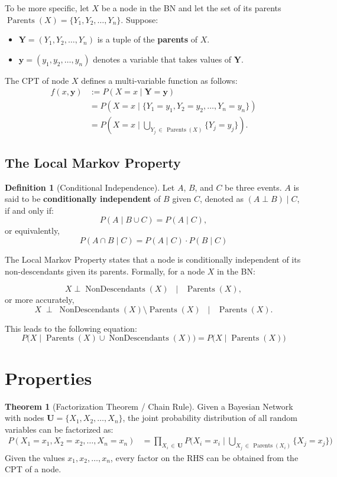 \documentclass[10pt,UTF8]{article}
\newenvironment{definitionBox}
{
  \begin{tcolorbox}[colback=blue!5!white,colframe=blue!75!black,parbox=false,before
  upper=\par,before lower=\par]}
  {
\end{tcolorbox}}
\newenvironment{theoremBox}
{
  \begin{tcolorbox}[colback=yellow!5!white,colframe=yellow!75!black,parbox=false,before
  upper=\par,before lower=\par]}
  {
\end{tcolorbox}}
\theoremstyle{definition}
\newtheorem{definition inner}{Definition}[section]
\newenvironment{definition}[1][]
{
  \begin{definitionBox}
  \begin{definition inner}[#1]\hfill\par}
    {
    \end{definition inner}
\end{definitionBox}}
\theoremstyle{definition}
\newtheorem{theorem inner}{Theorem}[section]
\newenvironment{theorem}[1][]
{
  \begin{theoremBox}
  \begin{theorem inner}[#1]\hfill\par}
    {
    \end{theorem inner}
\end{theoremBox}}
\theoremstyle{definition}
\newtheorem*{proof inner}{\textit{Proof}}
\theoremstyle{plain}
\newtheorem{tip inner}{Tip}[section]
\theoremstyle{remark}
\DeclareMathOperator{\Pa}{Parents} %
\DeclareMathOperator{\Nd}{NonDescendants} %
\begin{document}
To be more specific,
let \(X\) be a node in the BN and
let the set of its parents \(\Pa(X) = \{ Y_1, Y_2, \ldots, Y_n \} \). Suppose:
\begin{itemize}
  \item \(\bm{Y} = (Y_1, Y_2, \ldots, Y_n)\) is a tuple of the
    \textbf{parents} of \(X\).
  \item \(\bm{y} = (y_1, y_2, \ldots, y_n)\) denotes a variable that
    takes values of \(\bm{Y}\).
\end{itemize}
The CPT of node \(X\) defines a multi-variable function as follows:
\begin{align*}
  f(x, \bm{y}) & := P(X = x \mid \bm{Y} = \bm{y})
  \\
  & = P(X = x \mid  \big \{ Y_1 = y_1, Y_2 = y_2, \ldots, Y_n = y_n \big \} ) \\
  & = P(X = x \mid \! \! \! \!
    \bigcup_{Y_j \, \in \, \Pa(X)} \! \! \! \! \! \!
  \big \{ Y_j = y_j \big \} ).
\end{align*}

\subsection{The Local Markov Property}

\begin{definition}[Conditional Independence]
  Let \(A\), \(B\), and \(C\) be three events.
  \(A\) is said to be \textbf{conditionally independent} of \(B\) given \(C\),
  denoted as \((A \perp B )\mid C\),
  if and only if:
  \[
    P(A \mid B \cup C) = P(A \mid C),
  \]
  or equivalently,
  \[
    P(A \cap B \mid C) = P(A \mid C) \cdot
    P(B \mid C)
  \]
\end{definition}

The Local Markov Property states that a node is conditionally
independent of its non-descendants given its parents.
Formally, for a node \(X\) in the BN\@:

\[
  X \perp \Nd(X) \; \; \mid \; \; \Pa(X),
\]
or more accurately,
\[
  X \; \perp \; \Nd(X) \setminus \Pa(X)
  \; \; \mid \; \; \Pa(X).
\]

This leads to the following equation:
\[
  P\big(X \mid \Pa(X) \cup \Nd(X)\big) =
  P\big(X \mid \Pa(X)\big)
\]

\section{Properties}

\begin{theorem}[Factorization Theorem / Chain Rule]
  Given a Bayesian Network with nodes
  \(\bm{U} = \{ X_1, X_2, \ldots, X_n \} \),
  the joint probability distribution of all random variables can be
  factorized as:
  \begin{align*}
    P(X_1 = x_1, X_2 = x_2, \ldots, X_n = x_n)
    & = \prod_{X_i \, \in \, \bm{U}} P\Big(X_i = x_i \mid
      \! \! \! \! \! \!
      \bigcup_{X_j \, \in \, \Pa(X_i)}
      \! \! \! \! \! \! \! \!
    \big \{ X_j = x_j \big \}  \Big)
  \end{align*}
  Given the values \(x_1, x_2, \ldots, x_n\),
  every factor on the RHS can be obtained from the CPT of a node.
\end{theorem}
\end{document}
